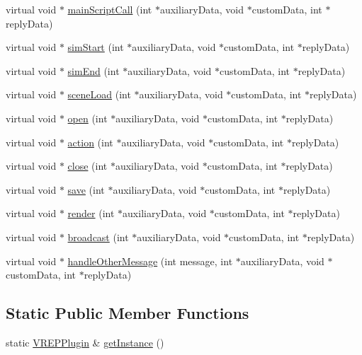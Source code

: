\begin{DoxyCompactItemize}
\item 
virtual void $\ast$ \hyperlink{classVREPPlugin_a5aa8491d41b377e75917ab1273674f9f}{main\+Script\+Call} (int $\ast$auxiliary\+Data, void $\ast$custom\+Data, int $\ast$reply\+Data)
\item 
virtual void $\ast$ \hyperlink{classVREPPlugin_a58c9675c38c6ca1a75047864d3e4253c}{sim\+Start} (int $\ast$auxiliary\+Data, void $\ast$custom\+Data, int $\ast$reply\+Data)
\item 
virtual void $\ast$ \hyperlink{classVREPPlugin_a13ea56c8546d762468b21ebc141b4ca3}{sim\+End} (int $\ast$auxiliary\+Data, void $\ast$custom\+Data, int $\ast$reply\+Data)
\item 
virtual void $\ast$ \hyperlink{classVREPPlugin_a77e10632cbc7ae0581a151daea83ab1f}{scene\+Load} (int $\ast$auxiliary\+Data, void $\ast$custom\+Data, int $\ast$reply\+Data)
\item 
virtual void $\ast$ \hyperlink{classVREPPlugin_a40ededcae0889e8f8ecdf99d0f455179}{open} (int $\ast$auxiliary\+Data, void $\ast$custom\+Data, int $\ast$reply\+Data)
\item 
virtual void $\ast$ \hyperlink{classVREPPlugin_a048e1fbf7b4b5b7b96ea6ec132218e12}{action} (int $\ast$auxiliary\+Data, void $\ast$custom\+Data, int $\ast$reply\+Data)
\item 
virtual void $\ast$ \hyperlink{classVREPPlugin_af9fc2e6b9adf1436fc06e2555eaa3c2b}{close} (int $\ast$auxiliary\+Data, void $\ast$custom\+Data, int $\ast$reply\+Data)
\item 
virtual void $\ast$ \hyperlink{classVREPPlugin_af6a19ea1a3fbe91a86df1e92e6f623a2}{save} (int $\ast$auxiliary\+Data, void $\ast$custom\+Data, int $\ast$reply\+Data)
\item 
virtual void $\ast$ \hyperlink{classVREPPlugin_a3fce674766334a4ad6c63a179dff64ae}{render} (int $\ast$auxiliary\+Data, void $\ast$custom\+Data, int $\ast$reply\+Data)
\item 
virtual void $\ast$ \hyperlink{classVREPPlugin_aa04f0d2bb1b0d73a46a99e699e11830f}{broadcast} (int $\ast$auxiliary\+Data, void $\ast$custom\+Data, int $\ast$reply\+Data)
\item 
virtual void $\ast$ \hyperlink{classVREPPlugin_af3a92d9202afe61bf4979d0e24bd5425}{handle\+Other\+Message} (int message, int $\ast$auxiliary\+Data, void $\ast$custom\+Data, int $\ast$reply\+Data)
\end{DoxyCompactItemize}
\subsection*{Static Public Member Functions}
\begin{DoxyCompactItemize}
\item 
static \hyperlink{classVREPPlugin}{V\+R\+E\+P\+Plugin} \& \hyperlink{classVREPPlugin_a6c54bebcd2d0c09e7a20dd72ae82ec71}{get\+Instance} ()
\end{DoxyCompactItemize}
